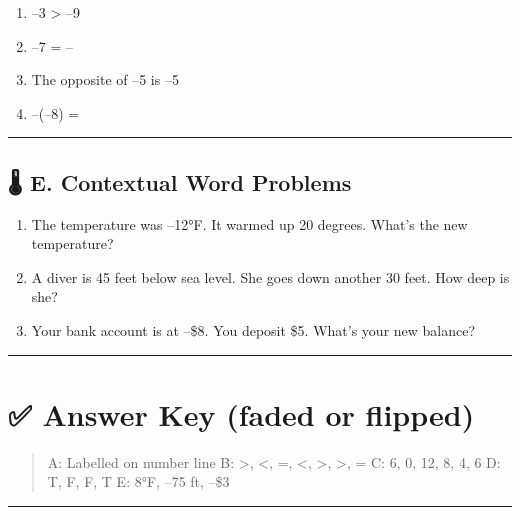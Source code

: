 \documentclass[
  letterpaper,
]{scrrept}
\providecommand{\tightlist}{%
  \setlength{\itemsep}{0pt}\setlength{\parskip}{0pt}}
\begin{document}
\begin{enumerate}
\def\labelenumi{\arabic{enumi}.}
\tightlist
\item
  --3 \textgreater{} --9
\item
  \textbar--7\textbar{} = --\textbar{}
\item
  The opposite of \textbar--5\textbar{} is --5
\item
  --(--8) = \textbar{}
\end{enumerate}

\begin{center}\rule{0.5\linewidth}{0.5pt}\end{center}

\subsection*{🌡️ E. Contextual Word
Problems}\label{e.-contextual-word-problems}

\begin{enumerate}
\def\labelenumi{\arabic{enumi}.}
\item
  The temperature was --12°F. It warmed up 20 degrees. What's the new
  temperature?
\item
  A diver is 45 feet below sea level. She goes down another 30 feet. How
  deep is she?
\item
  Your bank account is at --\$8. You deposit \$5. What's your new
  balance?
\end{enumerate}

\begin{center}\rule{0.5\linewidth}{0.5pt}\end{center}

\section*{✅ Answer Key (faded or
flipped)}\label{answer-key-faded-or-flipped}


\begin{quote}
A: Labelled on number line B: \textgreater, \textless, =, \textless,
\textgreater, \textgreater, = C: 6, 0, 12, 8, 4, 6 D: T, F, F, T E: 8°F,
--75 ft, --\$3
\end{quote}

\begin{center}\rule{0.5\linewidth}{0.5pt}\end{center}
\end{document}
